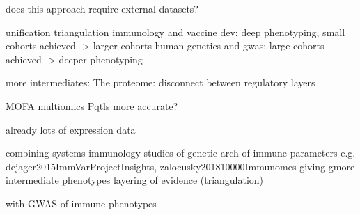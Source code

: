 \begin{outline}
        does this approach require external datasets?

unification
    triangulation
    immunology and vaccine dev: deep phenotyping, small cohorts achieved -> larger cohorts
    human genetics and gwas: large cohorts achieved -> deeper phenotyping

    more intermediates:
        The proteome: disconnect between regulatory layers

    MOFA
    multiomics
        Pqtls more accurate?

    already lots of expression data

    combining systems immunology studies of genetic arch of immune parameters
            e.g. dejager2015ImmVarProjectInsights, zalocusky201810000Immunomes
        giving gmore intermediate phenotypes
        layering of evidence (triangulation)

    with GWAS of immune phenotypes

%
%
%
%
%
%
%
%
%


\end{outline}
